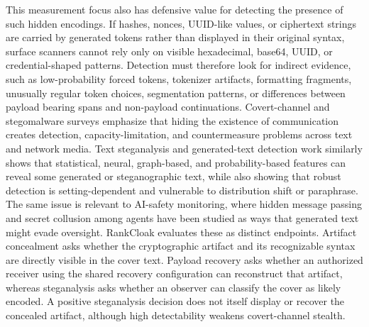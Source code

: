\documentclass[fleqn,10pt]{wlscirep}
\begin{document}
This measurement focus also has defensive value for detecting the presence of such hidden encodings. If hashes, nonces, UUID-like values, or ciphertext strings are carried by generated tokens rather than displayed in their original syntax, surface scanners cannot rely only on visible hexadecimal, base64, UUID, or credential-shaped patterns. Detection must therefore look for indirect evidence, such as low-probability forced tokens, tokenizer artifacts, formatting fragments, unusually regular token choices, segmentation patterns, or differences between payload bearing spans and non-payload continuations. Covert-channel and stegomalware surveys emphasize that hiding the existence of communication creates detection, capacity-limitation, and countermeasure problems across text and network media\cite{Zander2007CovertChannelsCountermeasures,Badar2025StegomalwareSurvey}. Text steganalysis and generated-text detection work similarly shows that statistical, neural, graph-based, and probability-based features can reveal some generated or steganographic text, while also showing that robust detection is setting-dependent and vulnerable to distribution shift or paraphrase\cite{Wen2019CNNTextSteganalysis,Wu2021GNNLinguisticSteganalysis,Wang2023FewShotLinguisticSteganalysis,Gehrmann2019GLTR,Mitchell2023DetectGPT,Sadasivan2025AIDetection}. The same issue is relevant to AI-safety monitoring, where hidden message passing and secret collusion among agents have been studied as ways that generated text might evade oversight\cite{Motwani2024SecretCollusion,Zolkowski2026EarlySigns}. RankCloak evaluates these as distinct endpoints. Artifact concealment asks whether the cryptographic artifact and its recognizable syntax are directly visible in the cover text. Payload recovery asks whether an authorized receiver using the shared recovery configuration can reconstruct that artifact, whereas steganalysis asks whether an observer can classify the cover as likely encoded. A positive steganalysis decision does not itself display or recover the concealed artifact, although high detectability weakens covert-channel stealth.
\end{document}
